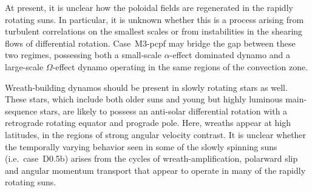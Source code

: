  At present, it is unclear how the
 poloidal fields are regenerated in the rapidly rotating suns.  In
 particular, it is unknown whether this is a process arising from
 turbulent correlations on the 
 smallest scales or from instabilities in the shearing flows of
 differential rotation.  Case~M3-pcpf may bridge the gap between these
 two regimes, possessing both a small-scale $\alpha$-effect dominated
 dynamo and a large-scale $\Omega$-effect dynamo operating in the same
 regions of the convection zone.  

 Wreath-building dynamos should be present in slowly
 rotating stars as well.  These stars, which include both older suns
 and young but highly luminous main-sequence stars, are likely to possess an
 anti-solar differential rotation with a retrograde rotating equator
 and prograde pole.  Here, wreaths appear at high latitudes, in
 the regions of strong angular velocity contrast.  It is unclear
 whether the temporally varying behavior seen in some of the slowly
 spinning suns (i.e.~case~D0.5b) arises from the cycles of
 wreath-amplification, polarward slip and angular momentum transport that
 appear to operate in many of the rapidly rotating suns. 


